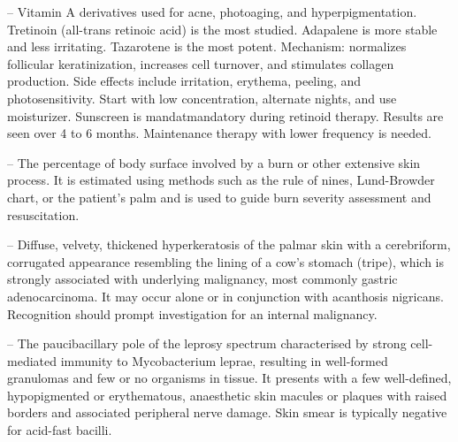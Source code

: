 -- Vitamin A derivatives used for acne, photoaging, and hyperpigmentation. Tretinoin (all-trans retinoic acid) is the most studied. Adapalene is more stable and less irritating. Tazarotene is the most potent. Mechanism: normalizes follicular keratinization, increases cell turnover, and stimulates collagen production. Side effects include irritation, erythema, peeling, and photosensitivity. Start with low concentration, alternate nights, and use moisturizer. Sunscreen is mandatmandatory during retinoid therapy. Results are seen over 4 to 6 months. Maintenance therapy with lower frequency is needed.

-- The percentage of body surface involved by a burn or other extensive skin process. It is estimated using methods such as the rule of nines, Lund-Browder chart, or the patient's palm and is used to guide burn severity assessment and resuscitation.

-- Diffuse, velvety, thickened hyperkeratosis of the palmar skin with a cerebriform, corrugated appearance resembling the lining of a cow's stomach (tripe), which is strongly associated with underlying malignancy, most commonly gastric adenocarcinoma. It may occur alone or in conjunction with acanthosis nigricans. Recognition should prompt investigation for an internal malignancy.

-- The paucibacillary pole of the leprosy spectrum characterised by strong cell-mediated immunity to Mycobacterium leprae, resulting in well-formed granulomas and few or no organisms in tissue. It presents with a few well-defined, hypopigmented or erythematous, anaesthetic skin macules or plaques with raised borders and associated peripheral nerve damage. Skin smear is typically negative for acid-fast bacilli.

